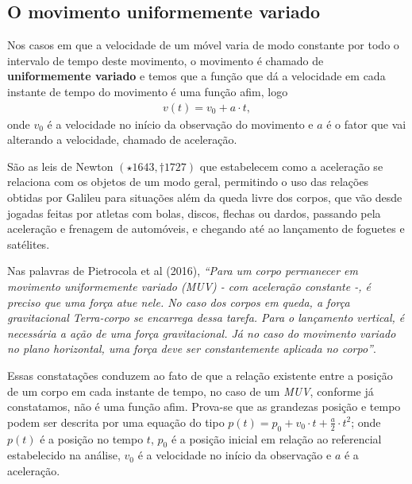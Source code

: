 \subsection{O movimento uniformemente variado}

Nos casos em que a velocidade de um móvel varia de modo constante por todo o intervalo de tempo deste movimento, o movimento é chamado de \textbf{uniformemente variado} e temos que a função que dá a velocidade em cada instante de tempo do movimento é uma função afim, logo
\begin{equation*}
\begin{split}v(t)=v_0 + a \cdot t,\end{split}
\end{equation*}
onde \(v_0\) é a velocidade no início da observação do movimento e \(a\) é o fator que vai alterando a velocidade, chamado de aceleração.

São as leis de Newton \((\star 1643, \dagger 1727)\) que estabelecem como a aceleração se relaciona com os objetos de um modo geral, permitindo o uso das relações obtidas por Galileu para situações além da queda livre dos corpos, que vão desde jogadas feitas por atletas com bolas, discos, flechas ou dardos, passando pela aceleração e frenagem de automóveis, e chegando até ao lançamento de foguetes e satélites.

Nas palavras de Pietrocola et al (2016), \textit{“Para um corpo permanecer em movimento uniformemente variado (MUV) - com aceleração constante -, é preciso que uma força atue nele. No caso dos corpos em queda, a força gravitacional Terra-corpo se encarrega dessa tarefa. Para o lançamento vertical, é necessária a ação de uma força gravitacional. Já no caso do movimento variado no plano horizontal, uma força deve ser constantemente aplicada no corpo”}.

Essas constatações conduzem ao fato de que a relação existente entre a posição de um corpo em cada instante de tempo, no caso de um \textit{MUV}, conforme já constatamos, não é uma função afim. Prova-se que as grandezas posição e tempo podem ser descrita por uma equação do tipo \(p(t)=p_0+v_0 \cdot t + \frac{a}{2} \cdot t^2\); onde \(p(t)\) é a posição no tempo \(t\), \(p_0\) é a posição inicial em relação ao referencial estabelecido na análise, \(v_0\) é a velocidade no início da observação e \(a\) é a aceleração.


